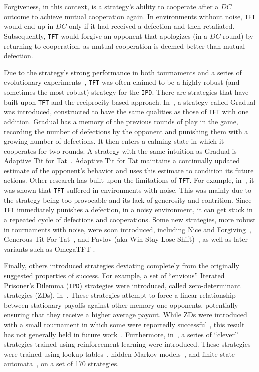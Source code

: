 \documentclass{article}
\def\TFT{\texttt{TFT}}
\def\IPD{\texttt{IPD}}
\begin{document}
Forgiveness, in this context, is a strategy's ability to cooperate after a
\(DC\) outcome to achieve mutual cooperation again. In environments without
noise, \TFT{} would end up in \(DC\) only if it had received a defection and
then retaliated. Subsequently, \TFT{} would forgive an opponent that apologizes
(in a \(DC\) round) by returning to cooperation, as mutual cooperation is deemed
better than mutual defection.

Due to the strategy's strong performance in both tournaments and a series of
evolutionary experiments~\cite{Axelrod1981}, \TFT{} was often claimed to be a
highly robust (and sometimes the most robust) strategy for the \IPD.
There are strategies that have built upon \TFT{} and the reciprocity-based
approach. In~\cite{Beaufils1997}, a strategy called Gradual was introduced,
constructed to have the same qualities as those of \TFT{} with one
addition. Gradual has a memory of the previous rounds of play in the game,
recording the number of defections by the opponent and punishing them with a
growing number of defections. It then enters a calming state in which it
cooperates for two rounds. A strategy with the same intuition as Gradual is
Adaptive Tit for Tat~\cite{tzafestas-2000a}. Adaptive Tit for Tat maintains a
continually updated estimate of the opponent's behavior and uses this estimate
to condition its future actions.
Other research has built upon the limitations of \TFT. For example,
in~\cite{Bendor1991, Donninger1986, Molander1985, Hammerstein1984}, it was shown
that \TFT{} suffered in environments with noise. This was mainly due to the
strategy being too provocable and its lack of generosity and contrition. Since
\TFT{} immediately punishes a defection, in a noisy environment, it can get
stuck in a repeated cycle of defections and cooperations. Some new strategies,
more robust in tournaments with noise, were soon introduced, including Nice and
Forgiving~\cite{Bendor1991}, Generous Tit For Tat~\cite{Nowak1992}, and Pavlov
(aka Win Stay Lose Shift)~\cite{Nowak1993}, as well as later variants such as
OmegaTFT \cite{kendall2007iterated}.

Finally, others introduced strategies deviating completely from the originally
suggested properties of success. For example, a set of ``envious'' Iterated
Prisoner's Dilemma (\IPD) strategies were introduced, called zero-determinant
strategies (ZDs), in~\cite{Press2012}. These strategies attempt to force a
linear relationship between stationary payoffs against other memory-one
opponents, potentially ensuring that they receive a higher average payout. While
ZDs were introduced with a small tournament in which some were reportedly
successful \cite{Stewart2012}, this result has not generally held in future
work~\cite{mathieu2017}. Furthermore, in~\cite{Harper2017}, a series of ``clever''
strategies trained using reinforcement learning were introduced. These
strategies were trained using lookup tables~\cite{Axelrod1987}, hidden Markov
models~\cite{Harper2017}, and finite-state automata~\cite{Miller1996}, on
a set of 170 strategies.
\end{document}
